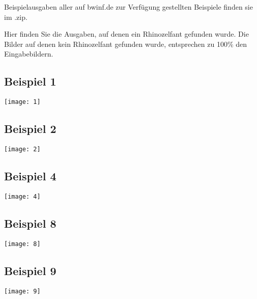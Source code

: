 Beispielausgaben aller auf bwinf.de zur Verfügung gestellten Beispiele finden sie im .zip.

Hier finden Sie die Ausgaben, auf denen ein Rhinozelfant gefunden wurde. Die Bilder auf denen kein Rhinozelfant gefunden wurde, entsprechen zu 100\% den Eingabebildern.

\subsection{Beispiel 1}
	\centering
	\texttt{[image: 1]}
\subsection{Beispiel 2}
	\centering
	\texttt{[image: 2]}
\subsection{Beispiel 4}
	\centering
	\texttt{[image: 4]}
\subsection{Beispiel 8}
	\centering
	\texttt{[image: 8]}
\subsection{Beispiel 9}
	\centering
	\texttt{[image: 9]}






